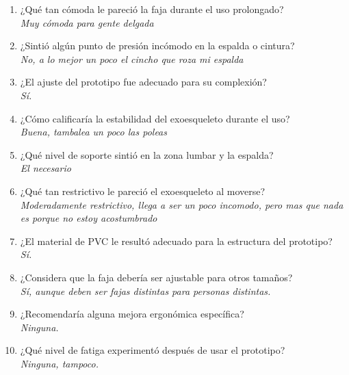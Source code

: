 \begin{enumerate}  
    \item ¿Qué tan cómoda le pareció la faja durante el uso prolongado? \\  
    \textit{Muy cómoda para gente delgada}  

    \item ¿Sintió algún punto de presión incómodo en la espalda o cintura? \\  
    \textit{No, a lo mejor un poco el cincho que roza mi espalda}  

    \item ¿El ajuste del prototipo fue adecuado para su complexión? \\  
    \textit{Sí.}  

    \item ¿Cómo calificaría la estabilidad del exoesqueleto durante el uso? \\  
    \textit{Buena, tambalea un poco las poleas}  

    \item ¿Qué nivel de soporte sintió en la zona lumbar y la espalda? \\  
    \textit{El necesario}  

    \item ¿Qué tan restrictivo le pareció el exoesqueleto al moverse? \\  
    \textit{Moderadamente restrictivo, llega a ser un poco incomodo, pero mas que nada es porque no estoy acostumbrado}  

    \item ¿El material de PVC le resultó adecuado para la estructura del prototipo? \\  
    \textit{Sí.}  

    \item ¿Considera que la faja debería ser ajustable para otros tamaños? \\  
    \textit{Sí, aunque deben ser fajas distintas para personas distintas.}  

    \item ¿Recomendaría alguna mejora ergonómica específica? \\  
    \textit{Ninguna.}  

    \item ¿Qué nivel de fatiga experimentó después de usar el prototipo? \\  
    \textit{Ninguna, tampoco.}  
\end{enumerate}  



